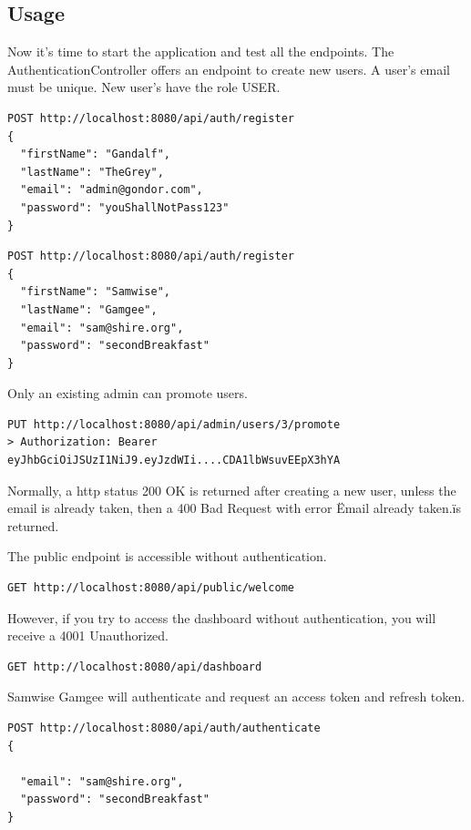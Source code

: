 \subsection{Usage}

Now it's time to start the application and test all the endpoints.
The AuthenticationController offers an endpoint to create new users. A user's email must be unique. New user's have the role USER. 

\begin{verbatim}
POST http://localhost:8080/api/auth/register
{
  "firstName": "Gandalf",
  "lastName": "TheGrey",
  "email": "admin@gondor.com",
  "password": "youShallNotPass123"
}
\end{verbatim}

\begin{verbatim}
POST http://localhost:8080/api/auth/register
{
  "firstName": "Samwise",
  "lastName": "Gamgee",
  "email": "sam@shire.org",
  "password": "secondBreakfast"
}
\end{verbatim}

Only an existing admin can promote users.

\begin{verbatim}
PUT http://localhost:8080/api/admin/users/3/promote
> Authorization: Bearer eyJhbGciOiJSUzI1NiJ9.eyJzdWIi....CDA1lbWsuvEEpX3hYA
\end{verbatim}

Normally, a http status 200 OK is returned after creating a new user, unless the email is already taken, then a 400 Bad Request with error \"Email already taken.\" is returned.

The public endpoint is accessible without authentication.

\begin{verbatim}
GET http://localhost:8080/api/public/welcome
\end{verbatim}

However, if you try to access the dashboard without authentication, you will receive a
4001 Unauthorized. 
\begin{verbatim}
GET http://localhost:8080/api/dashboard
\end{verbatim}

Samwise Gamgee will authenticate and request  an access token and refresh token.

\begin{verbatim}
POST http://localhost:8080/api/auth/authenticate
{
               
  "email": "sam@shire.org",
  "password": "secondBreakfast"
}
\end{verbatim}

